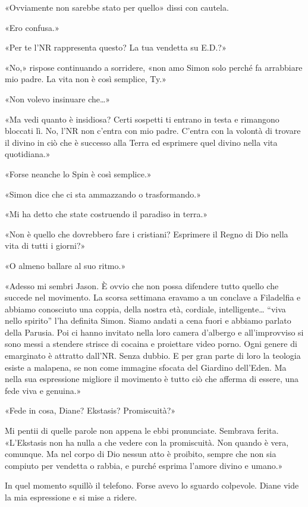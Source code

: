 «Ovviamente non sarebbe stato per quello» dissi con cautela.

«Ero confusa.»

«Per te l'NR rappresenta questo? La tua vendetta su E.D.?»

«No,» rispose continuando a sorridere, «non amo Simon solo perché fa
arrabbiare mio padre. La vita non è così semplice, Ty.»

«Non volevo insinuare che\ldots»

«Ma vedi quanto è insidiosa? Certi sospetti ti entrano in testa e
rimangono bloccati lì. No, l'NR non c'entra con mio padre. C'entra con
la volontà di trovare il divino in ciò che è successo alla Terra ed
esprimere quel divino nella vita quotidiana.»

«Forse neanche lo Spin è così semplice.»

«Simon dice che ci sta ammazzando o trasformando.»

«Mi ha detto che state costruendo il paradiso in terra.»

«Non è quello che dovrebbero fare i cristiani? Esprimere il Regno di Dio
nella vita di tutti i giorni?»

«O almeno ballare al suo ritmo.»

«Adesso mi sembri Jason. È ovvio che non possa difendere tutto quello
che succede nel movimento. La scorsa settimana eravamo a un conclave a
Filadelfia e abbiamo conosciuto una coppia, della nostra età, cordiale,
intelligente\ldots{} ``viva nello spirito'' l'ha definita Simon. Siamo
andati a cena fuori e abbiamo parlato della Parusia. Poi ci hanno
invitato nella loro camera d'albergo e all'improvviso si sono messi a
stendere strisce di cocaina e proiettare video porno. Ogni genere di
emarginato è attratto dall'NR. Senza dubbio. E per gran parte di loro la
teologia esiste a malapena, se non come immagine sfocata del Giardino
dell'Eden. Ma nella sua espressione migliore il movimento è tutto ciò
che afferma di essere, una fede viva e genuina.»

«Fede in cosa, Diane? Ekstasis? Promiscuità?»

Mi pentii di quelle parole non appena le ebbi pronunciate. Sembrava
ferita. «L'Ekstasis non ha nulla a che vedere con la promiscuità. Non
quando è vera, comunque. Ma nel corpo di Dio nessun atto è proibito,
sempre che non sia compiuto per vendetta o rabbia, e purché esprima
l'amore divino e umano.»

In quel momento squillò il telefono. Forse avevo lo sguardo colpevole.
Diane vide la mia espressione e si mise a ridere.

